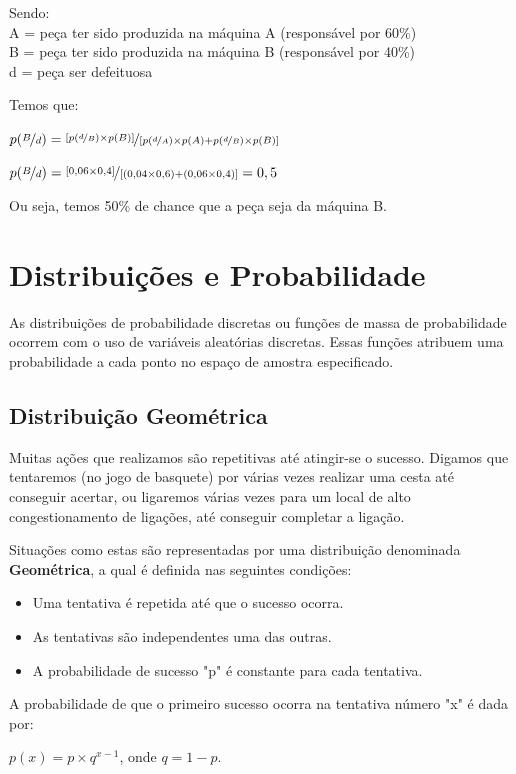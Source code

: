 \documentclass[a4paper,11pt]{article}
\begin{document}
Sendo: \\
A = peça ter sido produzida na máquina A (responsável por 60\%) \\
B = peça ter sido produzida na máquina B (responsável por 40\%) \\
d = peça ser defeituosa

Temos que:

$p( \nicefrac{B}{d} ) = \nicefrac{[p( \nicefrac{d}{B} ) \times p(B)]}{[p( \nicefrac{d}{A} ) \times p(A) + p( \nicefrac{d}{B} ) \times p(B)]}$

$p( \nicefrac{B}{d} ) = \nicefrac{[0,06 \times 0,4]}{[(0,04 \times 0,6) + (0,06 \times 0,4)]} = 0,5$

Ou seja, temos 50\% de chance que a peça seja da máquina B.

\section{Distribuições e Probabilidade}
As distribuições de probabilidade discretas ou funções de massa de probabilidade ocorrem com o uso de variáveis aleatórias discretas. Essas funções atribuem uma probabilidade a cada ponto no espaço de amostra especificado. 

\subsection{Distribuição Geométrica}
Muitas ações que realizamos são repetitivas até atingir-se o sucesso. Digamos que tentaremos (no jogo de basquete) por várias vezes realizar uma cesta até conseguir acertar, ou ligaremos várias vezes para um local de alto congestionamento de ligações, até conseguir completar a ligação.

Situações como estas são representadas por uma distribuição denominada \textbf{Geométrica}, a qual é definida nas seguintes condições:
\begin{itemize}[nolistsep]
	\item Uma tentativa é repetida até que o sucesso ocorra.
	\item As tentativas são independentes uma das outras.
	\item A probabilidade de sucesso "p" é constante para cada tentativa.
\end{itemize}

A probabilidade de que o primeiro sucesso ocorra na tentativa número "x" é dada por:

$p(x) = p \times q^{x - 1}$, onde $q = 1 - p$.
\end{document}
